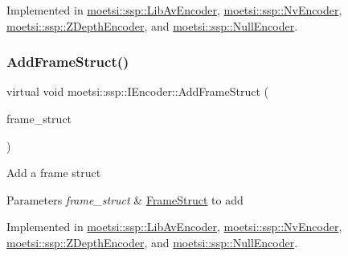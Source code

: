 Implemented in \hyperlink{classmoetsi_1_1ssp_1_1LibAvEncoder_acd321dd52800b23b383b2e9489118009}{moetsi\+::ssp\+::\+Lib\+Av\+Encoder}, \hyperlink{classmoetsi_1_1ssp_1_1NvEncoder_ac3b65f82f9f4cc07ae20b7dea81fa489}{moetsi\+::ssp\+::\+Nv\+Encoder}, \hyperlink{classmoetsi_1_1ssp_1_1ZDepthEncoder_aaacd9d8c4086d615e2a0254130787404}{moetsi\+::ssp\+::\+Z\+Depth\+Encoder}, and \hyperlink{classmoetsi_1_1ssp_1_1NullEncoder_afb703c45a8d4c58f650decabb18f357b}{moetsi\+::ssp\+::\+Null\+Encoder}.

\mbox{\label{classmoetsi_1_1ssp_1_1IEncoder_a8c223ec82fdd30ee8ee75157306054ec}} 
\subsubsection{\texorpdfstring{Add\+Frame\+Struct()}{AddFrameStruct()}\hspace{0.1cm}{\footnotesize\ttfamily [2/2]}}
{\footnotesize\ttfamily virtual void moetsi\+::ssp\+::\+I\+Encoder\+::\+Add\+Frame\+Struct (\begin{DoxyParamCaption}\item[{std\+::shared\+\_\+ptr$<$ \hyperlink{structmoetsi_1_1ssp_1_1FrameStruct}{Frame\+Struct} $>$ \&}]{frame\+\_\+struct }\end{DoxyParamCaption})\hspace{0.3cm}{\ttfamily [pure virtual]}}

Add a frame struct 
\begin{DoxyParams}{Parameters}
{\em frame\+\_\+struct} & \hyperlink{structmoetsi_1_1ssp_1_1FrameStruct}{Frame\+Struct} to add \\
\hline
\end{DoxyParams}


Implemented in \hyperlink{classmoetsi_1_1ssp_1_1LibAvEncoder_acd321dd52800b23b383b2e9489118009}{moetsi\+::ssp\+::\+Lib\+Av\+Encoder}, \hyperlink{classmoetsi_1_1ssp_1_1NvEncoder_ac3b65f82f9f4cc07ae20b7dea81fa489}{moetsi\+::ssp\+::\+Nv\+Encoder}, \hyperlink{classmoetsi_1_1ssp_1_1ZDepthEncoder_aaacd9d8c4086d615e2a0254130787404}{moetsi\+::ssp\+::\+Z\+Depth\+Encoder}, and \hyperlink{classmoetsi_1_1ssp_1_1NullEncoder_afb703c45a8d4c58f650decabb18f357b}{moetsi\+::ssp\+::\+Null\+Encoder}.

\mbox{\label{classmoetsi_1_1ssp_1_1IEncoder_a178d117518e7c7007414ea9c82bd3ed6}} 
